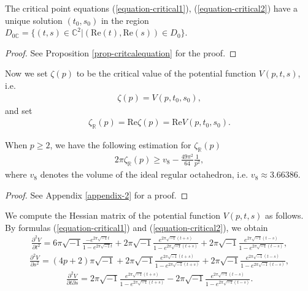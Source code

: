 \documentclass[12pt]{amsart}
\begin{document}
\begin{proposition}  \label{prop-critical}
 The critical point equations (\ref{equation-critical1}), (\ref{equation-critical2}) have a unique solution $(t_0,s_0)$ in the region $D_{0\mathbb{C}}=\{(t,s)\in \mathbb{C}^2| (\text{Re}(t),\text{Re}(s))\in D_0\}$.
\end{proposition}
\begin{proof}
See Proposition \ref{prop-critcalequation} for the proof.   
\end{proof}
Now we set 
$\zeta(p)$ to be the critical value of the potential function $V(p,t,s)$, i.e. 
\begin{align}
    \zeta(p)=V(p,t_0,s_0),
\end{align}
and set
\begin{align} \label{formula-zetaR(p)}
    \zeta_\mathbb{R}(p)=\text{Re} \zeta(p)=\text{Re} V(p,t_0,s_0). 
\end{align}



\begin{lemma} \label{lemma-volumeestimate}
When $p\geq 2$, we have the following estimation for $\zeta_{\mathbb{R}}(p)$
\begin{align}
    2\pi \zeta_{\mathbb{R}}(p)\geq v_8-\frac{49\pi^2}{64}\frac{1}{p^2},
\end{align}
where $v_8$ denotes the volume of the ideal regular octahedron, i.e. $v_8\approx 3.66386$.
\end{lemma}
\begin{proof}
    See Appendix \ref{appendix-2} for a proof. 
\end{proof}









We compute the Hessian matrix of the potential function $V(p,t,s)$ as follows. By formulas (\ref{equation-critical1}) and (\ref{equation-critical2}), we obtain 
\begin{align}
    \frac{\partial^2 V}{\partial t^2}=6\pi \sqrt{-1}\frac{-e^{2\pi\sqrt{-1}t}}{1-e^{2\pi\sqrt{-1}t}}+2\pi \sqrt{-1}\frac{e^{2\pi\sqrt{-1}(t+s)}}{1-e^{2\pi\sqrt{-1}(t+s)}}+2\pi \sqrt{-1}\frac{e^{2\pi\sqrt{-1}(t-s)}}{1-e^{2\pi\sqrt{-1}(t-s)}},
\end{align}
\begin{align}
    \frac{\partial^2 V}{\partial s^2}=(4p+2)\pi \sqrt{-1}+2\pi \sqrt{-1}\frac{e^{2\pi\sqrt{-1}(t+s)}}{1-e^{2\pi\sqrt{-1}(t+s)}}+2\pi \sqrt{-1}\frac{e^{2\pi\sqrt{-1}(t-s)}}{1-e^{2\pi\sqrt{-1}(t-s)}},
\end{align}
\begin{align}
    \frac{\partial^2 V}{\partial t\partial s}=2\pi \sqrt{-1}\frac{e^{2\pi\sqrt{-1}(t+s)}}{1-e^{2\pi\sqrt{-1}(t+s)}}-2\pi \sqrt{-1}\frac{e^{2\pi\sqrt{-1}(t-s)}}{1-e^{2\pi\sqrt{-1}(t-s)}}.
\end{align}
\end{document}
